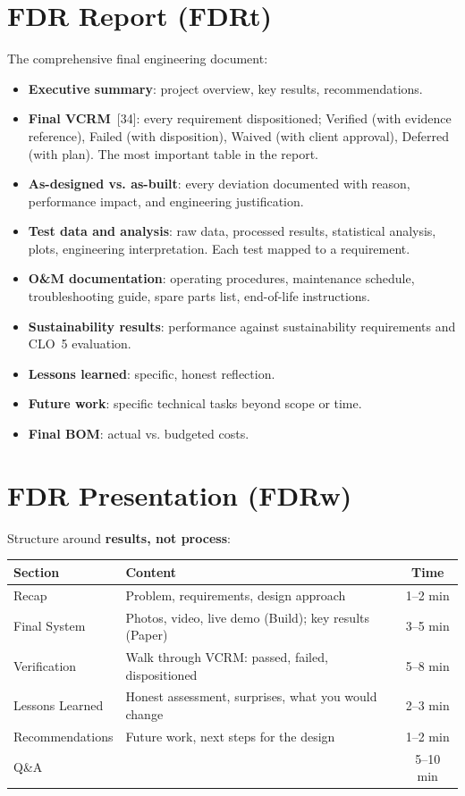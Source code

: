 \section{FDR Report (FDRt)}
The comprehensive final engineering document:
\begin{itemize}[nosep,leftmargin=1.5em]
\item \textbf{Executive summary}: project overview, key results, recommendations.
\item \textbf{Final VCRM}~[34]: every requirement dispositioned; Verified (with evidence reference), Failed (with disposition), Waived (with client approval), Deferred (with plan). The most important table in the report.
\item \textbf{As-designed vs. as-built}: every deviation documented with reason, performance impact, and engineering justification.
\item \textbf{Test data and analysis}: raw data, processed results, statistical analysis, plots, engineering interpretation. Each test mapped to a requirement.
\item \textbf{O\&M documentation}: operating procedures, maintenance schedule, troubleshooting guide, spare parts list, end-of-life instructions.
\item \textbf{Sustainability results}: performance against sustainability requirements and CLO~5 evaluation.
\item \textbf{Lessons learned}: specific, honest reflection.
\item \textbf{Future work}: specific technical tasks beyond scope or time.
\item \textbf{Final BOM}: actual vs. budgeted costs.
\end{itemize}

\section{FDR Presentation (FDRw)}
Structure around \textbf{results, not process}:

\begin{center}\small
\begin{tabularx}{\textwidth}{lXc}
\toprule
\textbf{Section} & \textbf{Content} & \textbf{Time} \\
\midrule
Recap & Problem, requirements, design approach & 1--2 min \\
Final System & Photos, video, live demo (Build); key results (Paper) & 3--5 min \\
Verification & Walk through VCRM: passed, failed, dispositioned & 5--8 min \\
Lessons Learned & Honest assessment, surprises, what you would change & 2--3 min \\
Recommendations & Future work, next steps for the design & 1--2 min \\
Q\&A & & 5--10 min \\
\bottomrule
\end{tabularx}
\end{center}

